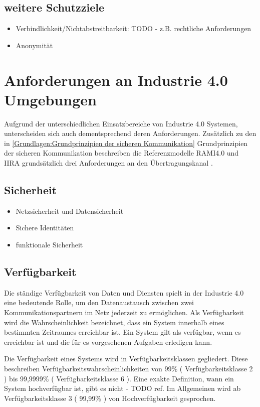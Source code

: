 \subsection{weitere Schutzziele}
\begin{itemize}
  \item Verbindlichkeit/Nichtabstreitbarkeit: TODO - z.B. rechtliche Anforderungen
  \item Anonymität
\end{itemize}

\section{Anforderungen an Industrie 4.0 Umgebungen}
Aufgrund der unterschiedlichen Einsatzbereiche von Industrie 4.0 Systemen, unterscheiden sich auch dementsprechend deren Anforderungen. Zusätzlich zu den in \autoref{Grundlagen:Grundprinzipien der sicheren Kommunikation} Grundprinzipien der sicheren Kommunikation beschreiben die Referenzmodelle \ac{RAMI4.0} und \ac{IIRA} grundsätzlich drei Anforderungen an den Übertragungskanal \cite{BMWiNeCon2016}.

\subsection{Sicherheit}
\begin{itemize}
    \item Netzsicherheit und Datensicherheit
    \item Sichere Identitäten
    \item funktionale Sicherheit
\end{itemize}

\subsection{Verfügbarkeit}
Die ständige Verfügbarkeit von Daten und Diensten spielt in der Industrie 4.0 eine bedeutende Rolle, um den Datenaustausch zwischen zwei Kommunikationspartnern im Netz jederzeit zu ermöglichen. Als Verfügbarkeit wird die Wahrscheinlichkeit bezeichnet, dass ein System innerhalb eines bestimmten Zeitraumes erreichbar ist. Ein System gilt als verfügbar, wenn es erreichbar ist und die für es vorgesehenen Aufgaben erledigen kann.

Die Verfügbarkeit eines Systems wird in Verfügbarkeitsklassen gegliedert. Diese beschreiben Verfügbarkeitswahrscheinlichkeiten von 99\% ( Verfügbarkeitsklasse 2 ) bis 99,9999\% ( Verfügbarkeitsklasse 6 ). Eine exakte Definition, wann ein System hochverfügbar ist, gibt es nicht - TODO ref. Im Allgemeinen wird ab Verfügbarkeitsklasse 3 ( 99,99\% ) von Hochverfügbarkeit gesprochen.

